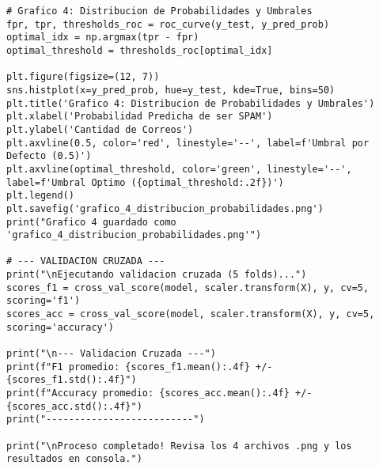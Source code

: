 \documentclass[12pt,a4paper]{article}
\begin{document}
\begin{lstlisting}
# Grafico 4: Distribucion de Probabilidades y Umbrales
fpr, tpr, thresholds_roc = roc_curve(y_test, y_pred_prob)
optimal_idx = np.argmax(tpr - fpr)
optimal_threshold = thresholds_roc[optimal_idx]

plt.figure(figsize=(12, 7))
sns.histplot(x=y_pred_prob, hue=y_test, kde=True, bins=50)
plt.title('Grafico 4: Distribucion de Probabilidades y Umbrales')
plt.xlabel('Probabilidad Predicha de ser SPAM')
plt.ylabel('Cantidad de Correos')
plt.axvline(0.5, color='red', linestyle='--', label=f'Umbral por Defecto (0.5)')
plt.axvline(optimal_threshold, color='green', linestyle='--', label=f'Umbral Optimo ({optimal_threshold:.2f})')
plt.legend()
plt.savefig('grafico_4_distribucion_probabilidades.png')
print("Grafico 4 guardado como 'grafico_4_distribucion_probabilidades.png'")

# --- VALIDACION CRUZADA ---
print("\nEjecutando validacion cruzada (5 folds)...")
scores_f1 = cross_val_score(model, scaler.transform(X), y, cv=5, scoring='f1')
scores_acc = cross_val_score(model, scaler.transform(X), y, cv=5, scoring='accuracy')

print("\n--- Validacion Cruzada ---")
print(f"F1 promedio: {scores_f1.mean():.4f} +/- {scores_f1.std():.4f}")
print(f"Accuracy promedio: {scores_acc.mean():.4f} +/- {scores_acc.std():.4f}")
print("--------------------------")

print("\nProceso completado! Revisa los 4 archivos .png y los resultados en consola.")
\end{lstlisting}
\end{document}
